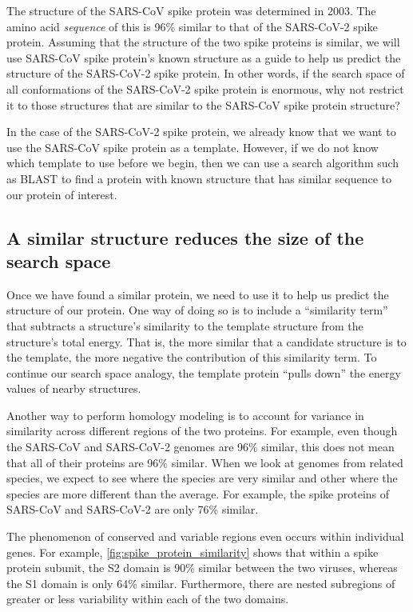 The structure of the SARS-CoV spike protein was determined in 2003. The amino acid \textit{sequence} of this  is 96\% similar to that of the SARS-CoV-2 spike protein. Assuming that the structure of the two spike proteins is similar, we will use SARS-CoV spike protein's known structure as a guide to help us predict the structure of the SARS-CoV-2 spike protein. In other words, if the search space of all conformations of the SARS-CoV-2 spike protein is enormous, why not restrict it to those structures that are similar to the SARS-CoV spike protein structure?

In the case of the SARS-CoV-2 spike protein, we already know that we want to use the SARS-CoV spike protein as a template. However, if we do not know which template to use before we begin, then we can use a search algorithm such as BLAST to find a protein with known structure that has similar sequence to our protein of interest.

\FloatBarrier
{}
\subsection{A similar structure reduces the size of the search space}

Once we have found a similar protein, we need to use it to help us predict the structure of our protein. One way of doing so is to include a ``similarity term'' that subtracts a structure's similarity to the template structure from the structure's total energy. That is, the more similar that a candidate structure is to the template, the more negative the contribution of this similarity term. To continue our search space analogy, the template protein ``pulls down'' the energy values of nearby structures.

Another way to perform homology modeling is to account for variance in similarity across different regions of the two proteins. For example, even though the SARS-CoV and SARS-CoV-2 genomes are 96\% similar, this does not mean that all of their proteins are 96\% similar. When we look at genomes from related species, we expect to see  where the species are very similar and other  where the species are more different than the average. For example, the spike proteins of SARS-CoV and SARS-CoV-2 are only 76\% similar.

The phenomenon of conserved and variable regions even occurs within individual genes. For example, \autoref{fig:spike_protein_similarity} shows that within a spike protein subunit, the S2 domain is 90\% similar between the two viruses, whereas the S1 domain is only 64\% similar. Furthermore, there are nested subregions of greater or less variability within each of the two domains.\\

